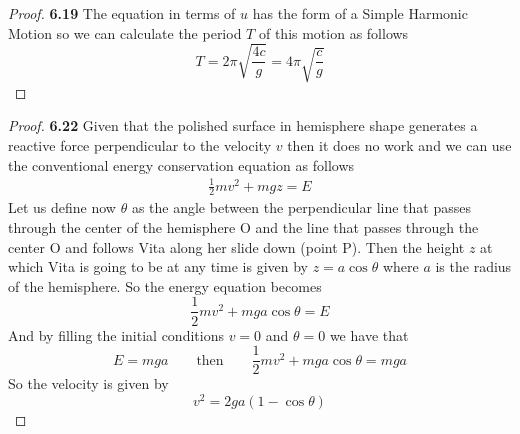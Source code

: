 \documentclass[11pt]{article}
\theoremstyle{definition}
\begin{document}
\begin{proof}{\textbf{6.19}}
        The equation in terms of $u$ has the form of a Simple Harmonic Motion so we can
        calculate the period $T$ of this motion as follows
        $$T = 2\pi \sqrt{\frac{4c}{g}} = 4\pi \sqrt{\frac{c}{g}}$$
    \end{proof}
    \begin{proof}{\textbf{6.22}}
        Given that the polished surface in hemisphere shape generates a reactive force
        perpendicular to the velocity $v$ then it does no work and we can use the
        conventional energy conservation equation as follows
        \begin{align*}
            \frac{1}{2}mv^2 + mgz = E
        \end{align*}
        Let us define now $\theta$ as the angle between the perpendicular line that
        passes through the center of the hemisphere O and the
        line that passes through the center O and follows Vita along her slide down
        (point P).
        Then the height $z$ at which Vita is going to be at any time is
        given by $z = a\cos\theta$ where $a$ is the radius of the hemisphere.
        So the energy equation becomes
        $$\frac{1}{2}mv^2 + mga\cos\theta = E$$
        And by filling the initial conditions $v=0$ and $\theta=0$ we have that
        $$E = mga \quad\quad\text{then}\quad\quad \frac{1}{2}mv^2 + mga\cos\theta = mga$$
        So the velocity is given by
        $$v^2 = 2ga(1 - \cos\theta)$$
        

\end{proof}
\end{document}
